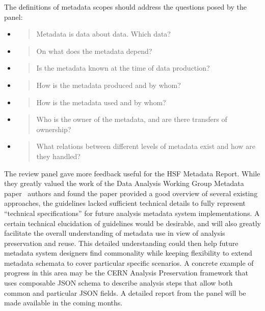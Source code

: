 \documentclass[a4paper,11pt]{article}
\begin{document}
The definitions of metadata scopes should address the questions posed by
the panel:

\begin{itemize}
\item
  \begin{quote}
  Metadata is data about data. Which data?
  \end{quote}
\item
  \begin{quote}
  On what does the metadata depend?
  \end{quote}
\item
  \begin{quote}
  Is the metadata known at the time of data production?
  \end{quote}
\item
  \begin{quote}
  How is the metadata produced and by whom?
  \end{quote}
\item
  \begin{quote}
  How is the metadata used and by whom?
  \end{quote}
\item
  \begin{quote}
  Who is the owner of the metadata, and are there transfers of
  ownership?
  \end{quote}
\item
  \begin{quote}
  What relations between different levels of metadata exist and how are
  they handled?
  \end{quote}
\end{itemize}

The review panel gave more feedback useful for the HSF Metadata Report.
While they greatly valued the work of the Data Analysis Working Group
Metadata paper~\cite{Khoo:2022pja} authors and found the paper provided a good
overview of several existing approaches, the guidelines lacked
sufficient technical details to fully represent ``technical
specifications'' for future analysis metadata system implementations. A
certain technical elucidation of guidelines would be desirable, and will
also greatly facilitate the overall understanding of metadata use in
view of analysis preservation and reuse. This detailed understanding
could then help future metadata system designers find commonality while
keeping flexibility to extend metadata schemata to cover particular
specific scenarios. A concrete example of progress in this area may be
the CERN Analysis Preservation framework that uses composable JSON
schema to describe analysis steps that allow both common and particular
JSON fields. A detailed report from the panel will be made available in
the coming months.
\end{document}
